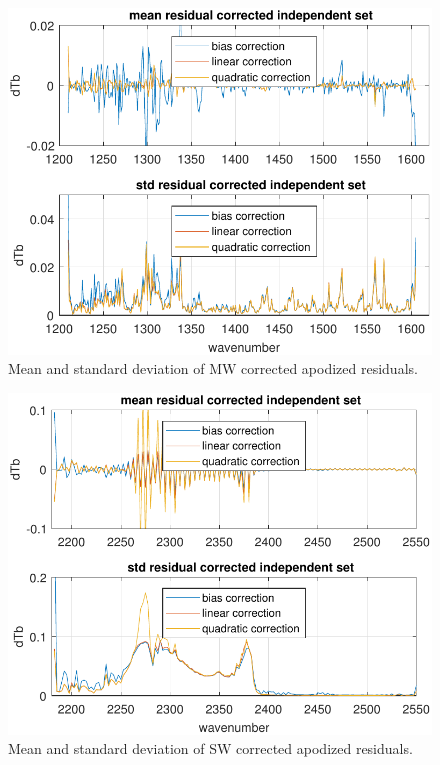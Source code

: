\documentclass[journal]{IEEEtran}
\begin{document}
\begin{figure} %
  \centering
  \includegraphics[width=\linewidth]{figures/a2cris_regr_MW.pdf}
  \caption{Mean and standard deviation of MW corrected apodized
    residuals.}
  \label{statMW}
\end{figure}

\begin{figure} %
  \centering
  \includegraphics[width=\linewidth]{figures/a2cris_regr_SW.pdf}
  \caption{Mean and standard deviation of SW corrected apodized
    residuals.}
  \label{statSW}
\end{figure}
\end{document}
